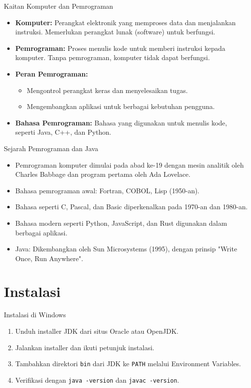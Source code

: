 \documentclass[aspectratio=169, table]{beamer}
\begin{document}
\begin{frame}{Kaitan Komputer dan Pemrograman}
	\begin{itemize}
		\item \textbf{Komputer:} Perangkat elektronik yang memproses data dan menjalankan instruksi. Memerlukan perangkat lunak (software) untuk berfungsi.
		\item \textbf{Pemrograman:} Proses menulis kode untuk memberi instruksi kepada komputer. Tanpa pemrograman, komputer tidak dapat berfungsi.
		\item \textbf{Peran Pemrograman:}
		\begin{itemize}
			\item Mengontrol perangkat keras dan menyelesaikan tugas.
			\item Mengembangkan aplikasi untuk berbagai kebutuhan pengguna.
		\end{itemize}
		\item \textbf{Bahasa Pemrograman:} Bahasa yang digunakan untuk menulis kode, seperti Java, C++, dan Python.
	\end{itemize}
\end{frame}


\begin{frame}[fragile]{Sejarah Pemrograman dan Java}
\begin{itemize}
\item Pemrograman komputer dimulai pada abad ke-19 dengan mesin analitik oleh Charles Babbage dan program pertama oleh Ada Lovelace.
\item Bahasa pemrograman awal: Fortran, COBOL, Lisp (1950-an).
\item Bahasa seperti C, Pascal, dan Basic diperkenalkan pada 1970-an dan 1980-an.
\item Bahasa modern seperti Python, JavaScript, dan Rust digunakan dalam berbagai aplikasi.
\item Java: Dikembangkan oleh Sun Microsystems (1995), dengan prinsip "Write Once, Run Anywhere".
\end{itemize}
\end{frame}

\section{Instalasi}
\begin{frame}[fragile]{Instalasi di Windows}
\begin{enumerate}
\item Unduh installer JDK dari situs Oracle atau OpenJDK.
\item Jalankan installer dan ikuti petunjuk instalasi.
\item Tambahkan direktori \texttt{bin} dari JDK ke \texttt{PATH} melalui Environment Variables.
\item Verifikasi dengan \texttt{java -version} dan \texttt{javac -version}.
\end{enumerate}
\end{frame}
\end{document}
